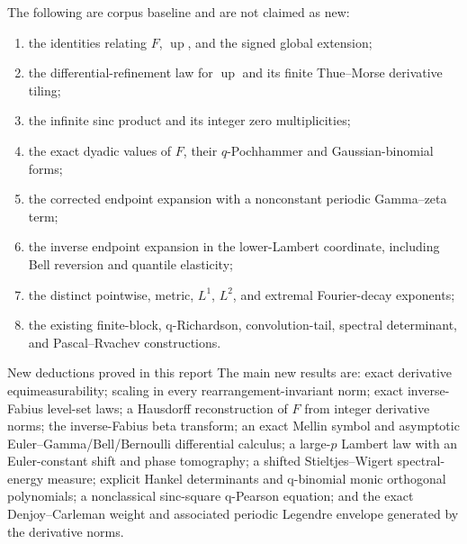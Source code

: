 \documentclass[11pt,oneside]{article}
\theoremstyle{definition}
\theoremstyle{remark}
\newcommand{\Up}{\operatorname{up}}
\begin{document}
The following are corpus baseline and are not claimed as new:
\begin{enumerate}[label=(\roman*)]
\item the identities relating $F$, $\Up$, and the signed global extension;
\item the differential-refinement law for $\Up$ and its finite Thue--Morse derivative tiling;
\item the infinite sinc product and its integer zero multiplicities;
\item the exact dyadic values of $F$, their $q$-Pochhammer and Gaussian-binomial forms;
\item the corrected endpoint expansion with a nonconstant periodic Gamma--zeta term;
\item the inverse endpoint expansion in the lower-Lambert coordinate, including Bell
      reversion and quantile elasticity;
\item the distinct pointwise, metric, $L^1$, $L^2$, and extremal Fourier-decay exponents;
\item the existing finite-block, q-Richardson, convolution-tail, spectral determinant,
      and Pascal--Rvachev constructions.
\end{enumerate}

\begin{resultbox}{New deductions proved in this report}
The main new results are: exact derivative equimeasurability; scaling in every
rearrangement-invariant norm; exact inverse-Fabius level-set laws; a Hausdorff reconstruction
of $F$ from integer derivative norms; the inverse-Fabius beta transform; an exact Mellin
symbol and asymptotic Euler--Gamma/Bell/Bernoulli differential calculus; a large-$p$
Lambert law with an Euler-constant shift and phase tomography; a shifted
Stieltjes--Wigert spectral-energy measure; explicit Hankel determinants and q-binomial monic
orthogonal polynomials; a nonclassical sinc-square q-Pearson equation; and the exact
Denjoy--Carleman weight and associated periodic Legendre envelope generated by the derivative
norms.
\end{resultbox}
\end{document}
